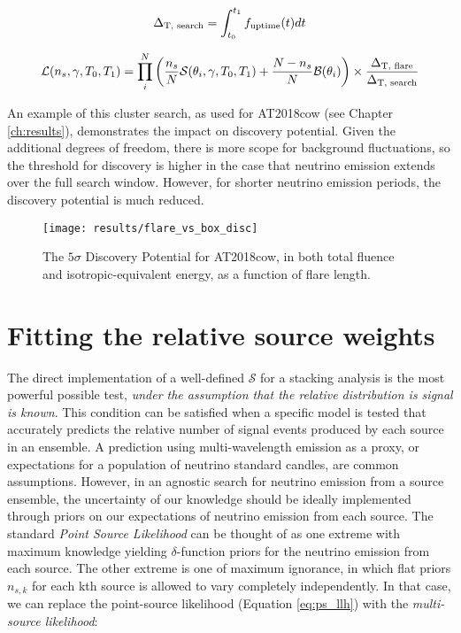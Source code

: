 \begin{equation}
\Delta_{\textup{T, search}} = \int_{t_{0}}^{t_{1}}f_{\textup{uptime}}(t) dt
\end{equation}

\begin{equation}
\mathcal{L}(n_{s}, \gamma, T_{0}, T_{1}) = \prod_{i}^{N} \left(\frac{n_{s}}{N} \mathcal{S}(\theta_{i}, \gamma, T_{0}, T_{1}) + \frac{N - n_{s}}{N} \mathcal{B}(\theta_{i})  \right) \times \frac{\Delta_{\textup{T, flare}}}{\Delta_{\textup{T, search}}}
\end{equation}

An example of this cluster search, as used for AT2018cow (see Chapter \ref{ch:results}), demonstrates the impact on discovery potential. Given the additional degrees of freedom, there is more scope for background fluctuations, so the threshold for discovery is higher in the case that neutrino emission extends over the full search window. However, for shorter neutrino emission periods, the discovery potential is much reduced.

\begin{figure}[!ht]
	\centering \texttt{[image: results/flare\_vs\_box\_disc]}
	\caption{The $5\sigma$ Discovery Potential for AT2018cow, in both total fluence and isotropic-equivalent energy, as a function of flare length.}
	\label{fig:DiscTime}
\end{figure}

\section{Fitting the relative source weights}
\label{sec:fit_weights}

The direct implementation of a well-defined $\mathcal{S}$ for a stacking analysis is the most powerful possible test, \emph{under the assumption that the relative distribution is signal is known}. This condition can be satisfied when a specific model is tested that accurately predicts the relative number of signal events produced by each source in an ensemble. A prediction using multi-wavelength emission as a proxy, or expectations for a population of neutrino standard candles, are common assumptions. However, in an agnostic search for neutrino emission from a source ensemble, the uncertainty of our knowledge should be ideally implemented through priors on our expectations of neutrino emission from each source. The standard \emph{Point Source Likelihood} can be thought of as one extreme with maximum knowledge yielding $\delta$-function priors for the neutrino emission from each source. The other extreme is one of maximum ignorance, in which flat priors $n_{s, k}$ for each kth source is allowed to vary completely independently. In that case, we can replace the point-source likelihood (Equation \ref{eq:ps_llh}) with the \emph{multi-source likelihood}:

